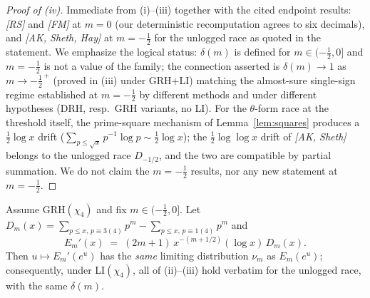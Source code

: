 \begin{proof}[Proof of (iv)]
Immediate from (i)--(iii) together with the cited endpoint results:
\emph{[RS]} and \emph{[FM]} at $m=0$ (our deterministic recomputation
agrees to six decimals), and \emph{[AK, Sheth, Hay]} at $m=-\tfrac12$
for the unlogged race as quoted in the statement. We emphasize the
logical status: $\delta(m)$ is defined for $m\in(-\tfrac12,0]$ and
$m=-\tfrac12$ is not a value of the family; the connection asserted is
$\delta(m)\to1$ as $m\to-\tfrac12^{\,+}$ (proved in (iii) under
GRH+LI) matching the almost-sure single-sign regime established at
$m=-\tfrac12$ by different methods and under different hypotheses
(DRH, resp.\ GRH variants, no LI). For the $\theta$-form race at the
threshold itself, the prime-square mechanism of
Lemma~\ref{lem:squares} produces a $\tfrac12\log x$ drift
($\sum_{p\le\sqrt x}p^{-1}\log p\sim\tfrac12\log x$); the
$\tfrac12\log\log x$ drift of \emph{[AK, Sheth]} belongs to the
unlogged race $D_{-1/2}$, and the two are compatible by partial
summation. We do not claim the $m=-\tfrac12$ results, nor any new
statement at $m=-\tfrac12$.
\end{proof}

\begin{proposition}\label{prop:unlogged}
Assume GRH$(\chi_4)$ and fix $m\in(-\tfrac12,0]$. Let
$D_m(x)=\sum_{p\le x,\,p\equiv3(4)}p^m-\sum_{p\le x,\,p\equiv1(4)}p^m$
and
\[
E_m'(x)\;=\;(2m+1)\,x^{-(m+1/2)}(\log x)\,D_m(x).
\]
Then $u\mapsto E_m'(e^u)$ has the \emph{same} limiting distribution
$\nu_m$ as $E_m(e^u)$; consequently, under LI$(\chi_4)$, all of
(ii)--(iii) hold verbatim for the unlogged race, with the same
$\delta(m)$.
\end{proposition}

